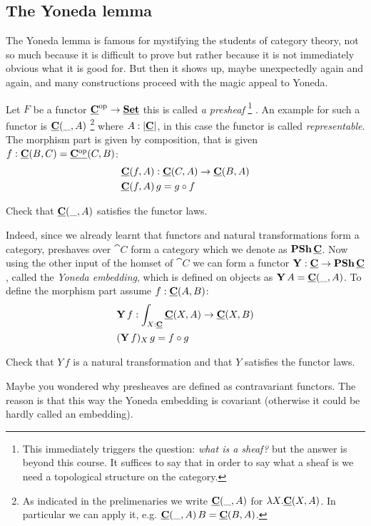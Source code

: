 \subsection{The Yoneda lemma}
\label{sec:yoneda-lemma}

The Yoneda lemma is famous for mystifying the students of category theory, not so much because it is difficult to prove but rather because it is not immediately obvious what it is good for. But then it shows up, maybe unexpectedly again and again, and many constructions proceed with the magic appeal to Yoneda. 


Let $F$ be a functor $\underline{\mathbf{C}}^{\mathrm{op}} \to \underline{\mathbf{\mathbf{Set}}}$ this is called \emph{a presheaf}%
\footnote{This immediately triggers the question: \emph{what is a sheaf?} but the answer is beyond this course. It suffices to say that in order to say what a sheaf is we need a topological structure on the category.}
. An example for such a functor is $\underline{\mathbf{C}}(\_,A)$
\footnote{As indicated in the prelimenaries we write $\underline{\mathbf{C}}(\_,A)$ for $\lambda X.\underline{\mathbf{C}}(X,A)$. In particular we can apply it, e.g. $\underline{\mathbf{C}}(\_,A)\,B = \underline{\mathbf{C}}(B,A)$.}
 where $A:|\underline{\mathbf{C}}|$, in this case the functor is called \emph{representable}. The morphism part is given by composition, that is given $f:\underline{\mathbf{C}}(B,C) = \underline{\mathbf{C^{\mathrm{op}}}}(C,B)$:
\begin{align*}
&\underline{\mathbf{C}}(f,A) : \underline{\mathbf{C}}(C,A) \to \underline{\mathbf{C}}(B,A) \\
&\underline{\mathbf{C}}(f,A) \,g =  g \circ f
\end{align*}
\begin{Exercise}
  Check that $\underline{\mathbf{C}}(\_,A)$ satisfies the functor laws.
\end{Exercise}
Indeed, since we already learnt that functors and natural transformations form a category, preshaves over $\cat{C}$ form a category which we denote as $\mathbf{PSh}\,\underline{\mathbf{C}}$. Now using the other input of the homset of $\cat{C}$ we can form a functor $\mathbf{Y} : \underline{\mathbf{C}} \to \mathbf{PSh}\,\underline{\mathbf{C}}$, called the \emph{Yoneda embedding}, which is defined on objects as $\mathbf{Y}\,A = \underline{\mathbf{C}}(\_,A)$. To define the morphism part assume $f:\underline{\mathbf{C}}(A,B)$:
\begin{align*}
& \mathbf{Y}\,f :  \int_{X:\underline{\mathbf{C}}}\underline{\mathbf{C}}(X,A) \to \underline{\mathbf{C}}(X,B) \\
& (\mathbf{Y}\,f)_X\,g = f \circ g
\end{align*}
\begin{Exercise}
  Check that $Y\,f$ is a natural transformation and that $Y$ satisfies the functor laws.
\end{Exercise}
Maybe you wondered why presheaves are defined as contravariant functors. The reason is that this way the Yoneda embedding is covariant (otherwise it could be hardly called an embedding).

